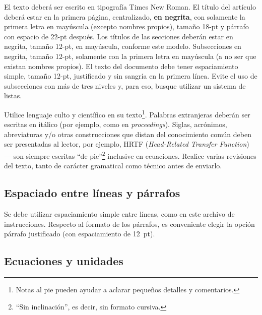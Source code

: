 \documentclass[12pt, a4paper, twoside, twocolumn]{article}
\begin{document}
El texto deberá ser escrito en tipografía Times New Roman. El título del artículo deberá estar en la primera página, centralizado, \textbf{en negrita}, con solamente la primera letra en mayúscula (excepto nombres propios), tamaño 18-pt y párrafo con espacio de 22-pt después. Los títulos de las secciones deberán estar en negrita, tamaño 12-pt, en mayúscula, conforme este modelo. Subsecciones en negrita, tamaño 12-pt, solamente con la primera letra en mayúscula (a no ser que existan nombres propios). El texto del documento debe tener espaciamiento simple, tamaño 12-pt, justificado y sin sangría en la primera línea. Evite el uso de subsecciones con más de tres niveles y, para eso, busque utilizar un sistema de listas.


Utilice lenguaje culto y científico en su texto\footnote{Notas al pie pueden ayudar a aclarar pequeños detalles y comentarios.}. Palabras extranjeras deberán ser escritas en itálico (por ejemplo, como en \textit{proceedings}). Siglas, acrónimos, abreviaturas y/o otras construcciones que distan del conocimiento común deben ser presentadas al lector, por ejemplo, HRTF (\textit{Head-Related Transfer Function}) --- son siempre escritas  ``de pie''\footnote{``Sin inclinación'', es decir, sin formato cursiva.} inclusive en ecuaciones. Realice varias revisiones del texto, tanto de carácter gramatical como técnico antes de enviarlo.

\subsection{Espaciado entre líneas y párrafos}

Se debe utilizar espaciamiento simple entre líneas, como en este archivo de instrucciones.
Respecto al formato de los párrafos, es conveniente elegir la opción párrafo justificado (con espaciamiento de 12~pt).


\subsection{Ecuaciones y unidades}
\end{document}
